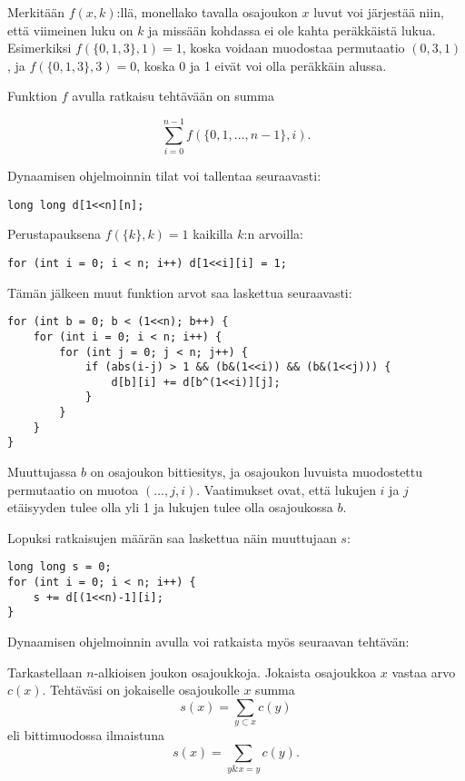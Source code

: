 Merkitään $f(x,k)$:llä,
monellako tavalla osajoukon
$x$ luvut voi järjestää niin,
että viimeinen luku on $k$ ja missään kohdassa
ei ole kahta peräkkäistä lukua.
Esimerkiksi $f(\{0,1,3\},1)=1$,
koska voidaan muodostaa permutaatio $(0,3,1)$,
ja $f(\{0,1,3\},3)=0$, koska 0 ja 1 eivät
voi olla peräkkäin alussa.

Funktion $f$ avulla ratkaisu tehtävään
on summa

\[ \sum_{i=0}^{n-1} f(\{0,1,\ldots,n-1\},i). \]

\noindent
Dynaamisen ohjelmoinnin tilat voi
tallentaa seuraavasti:

\begin{lstlisting}
long long d[1<<n][n];
\end{lstlisting}

\noindent
Perustapauksena $f(\{k\},k)=1$ kaikilla $k$:n arvoilla:

\begin{lstlisting}
for (int i = 0; i < n; i++) d[1<<i][i] = 1;
\end{lstlisting}

\noindent
Tämän jälkeen muut funktion arvot
saa laskettua seuraavasti:

\begin{lstlisting}
for (int b = 0; b < (1<<n); b++) {
    for (int i = 0; i < n; i++) {
        for (int j = 0; j < n; j++) {
            if (abs(i-j) > 1 && (b&(1<<i)) && (b&(1<<j))) {
                d[b][i] += d[b^(1<<i)][j];
            }
        }
    }
}
\end{lstlisting}

\noindent
Muuttujassa $b$ on osajoukon bittiesitys,
ja osajoukon luvuista muodostettu
permutaatio on muotoa $(\ldots,j,i)$.
Vaatimukset ovat, että lukujen $i$ ja $j$
etäisyyden tulee olla yli 1
ja lukujen tulee olla osajoukossa $b$.

Lopuksi ratkaisujen määrän saa laskettua näin
muuttujaan $s$:

\begin{lstlisting}
long long s = 0;
for (int i = 0; i < n; i++) {
    s += d[(1<<n)-1][i];
}
\end{lstlisting}

\noindent
Dynaamisen ohjelmoinnin avulla voi ratkaista
myös seuraavan tehtävän:

\begin{task}
Tarkastellaan $n$-alkioisen joukon osajoukkoja.
Jokaista osajoukkoa $x$ vastaa arvo $c(x)$.
Tehtäväsi on jokaiselle osajoukolle $x$
summa
\[s(x)=\sum_{y \subset x} c(y) \]
eli bittimuodossa ilmaistuna
\[s(x)=\sum_{y \& x = y} c(y). \]
\end{task}

